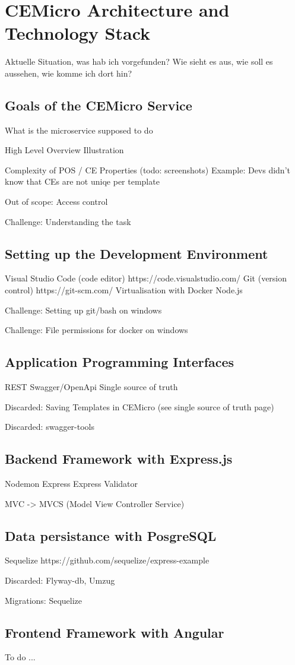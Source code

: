 \chapter{CEMicro Architecture and Technology Stack}
\label{sec:arch}

Aktuelle Situation, was hab ich vorgefunden?
Wie sieht es aus, wie soll es aussehen, wie komme ich dort hin?


\section{Goals of the CEMicro Service}

What is the microservice supposed to do

High Level Overview Illustration

Complexity of POS / CE Properties (todo: screenshots)
Example: Devs didn't know that CEs are not uniqe per template

Out of scope: Access control

Challenge: Understanding the task


\section{Setting up the Development Environment}

Visual Studio Code (code editor) https://code.visualstudio.com/
Git (version control) https://git-scm.com/
Virtualisation with Docker
Node.js

Challenge: Setting up git/bash on windows

Challenge: File permissions for docker on windows


\section{Application Programming Interfaces}

REST
Swagger/OpenApi
Single source of truth

Discarded: Saving Templates in CEMicro (see single source of truth page)

Discarded: swagger-tools


\section{Backend Framework with Express.js}

Nodemon
Express
Express Validator

MVC -> MVCS (Model View Controller Service)


\section{Data persistance with PosgreSQL}

Sequelize
https://github.com/sequelize/express-example

Discarded: Flyway-db, Umzug

Migrations: Sequelize


\section{Frontend Framework with Angular}

To do ...
